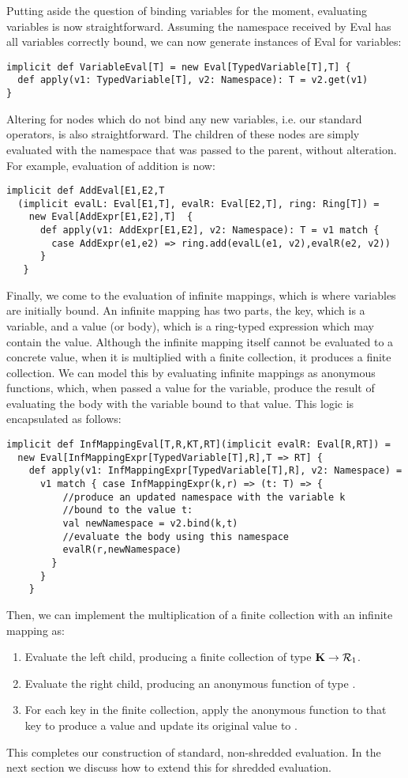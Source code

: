 Putting aside the question of binding variables for the moment, evaluating variables is now straightforward. Assuming the namespace received by Eval has all variables correctly bound, we can now generate instances of Eval for variables:
\vs\begin{lstlisting}
implicit def VariableEval[T] = new Eval[TypedVariable[T],T] {
  def apply(v1: TypedVariable[T], v2: Namespace): T = v2.get(v1)
}
\end{lstlisting}\vs
Altering  for nodes which do not bind any new variables, i.e. our standard operators, is also straightforward. The children of these nodes are simply evaluated with the namespace that was passed to the parent, without alteration. For example, evaluation of addition is now:
\vs\begin{lstlisting}
implicit def AddEval[E1,E2,T
  (implicit evalL: Eval[E1,T], evalR: Eval[E2,T], ring: Ring[T]) =
    new Eval[AddExpr[E1,E2],T]  {
      def apply(v1: AddExpr[E1,E2], v2: Namespace): T = v1 match {
        case AddExpr(e1,e2) => ring.add(evalL(e1, v2),evalR(e2, v2))
      }
   }
\end{lstlisting}\vs
Finally, we come to the evaluation of infinite mappings, which is where variables are initially bound. An infinite mapping has two parts, the key, which is a variable, and a value (or body), which is a ring-typed expression which may contain the value. Although the infinite mapping itself cannot be evaluated to a concrete value, when it is multiplied with a finite collection, it produces a finite collection. We can model this by evaluating infinite mappings as anonymous functions, which, when passed a value for the variable, produce the result of evaluating the body with the variable bound to that value. This logic is encapsulated as follows:
\vs\begin{lstlisting}
implicit def InfMappingEval[T,R,KT,RT](implicit evalR: Eval[R,RT]) =
  new Eval[InfMappingExpr[TypedVariable[T],R],T => RT] {
    def apply(v1: InfMappingExpr[TypedVariable[T],R], v2: Namespace) =
      v1 match { case InfMappingExpr(k,r) => (t: T) => {
          //produce an updated namespace with the variable k
          //bound to the value t:
          val newNamespace = v2.bind(k,t)
          //evaluate the body using this namespace
          evalR(r,newNamespace) 
        }
      }
    }
\end{lstlisting}\vs
Then, we can implement the multiplication of a finite collection with an infinite mapping as:
\begin{enumerate}
\item{Evaluate the left child, producing a finite collection of type $\mathbf{K} \rightarrow \mathcal{R}_1$}.
\item{Evaluate the right child, producing an anonymous function of type }.
\item{For each key in the finite collection, apply the anonymous function to that key to produce a value  and update its original value  to .}
\end{enumerate}
\vs
This completes our construction of standard, non-shredded evaluation. In the next section we discuss how to extend this for shredded evaluation.


